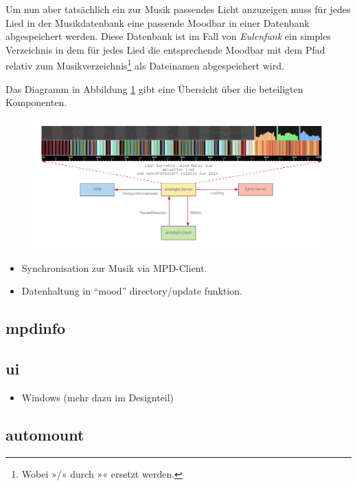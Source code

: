 \documentclass[11pt,ngerman,toc=listof,index=totoc]{scrreprt}
\providecommand{\tightlist}{%
  \setlength{\itemsep}{0pt}\setlength{\parskip}{0pt}}
\begin{document}
Um nun aber tatsächlich ein zur Musik passendes Licht anzuzeigen muss
für jedes Lied in der Musikdatenbank eine passende Moodbar in einer
Datenbank abgespeichert werden. Diese Datenbank ist im Fall von
\emph{Eulenfunk} ein simples Verzeichnis in dem für jedes Lied die
entsprechende Moodbar mit dem Pfad relativ zum
Musikverzeichnis\footnote{Wobei »/« durch »\textbar{}« ersetzt werden.}
als Dateinamen abgespeichert wird.

Das Diagramm in Abbildung \ref{eulenfunk-ambilight} gibt eine Übersicht
über die beteiligten Komponenten.

\begin{figure}[h!]
  \centering
  \includegraphics[width=1.0\textwidth]{images/eulenfunk-ambilight.png}
  \caption{}
  \label{eulenfunk-ambilight}
\end{figure}

\begin{itemize}
\tightlist
\item
  Synchronisation zur Musik via MPD-Client.
\item
  Datenhaltung in \enquote{mood} directory/update funktion.
\end{itemize}

\subsection{mpdinfo}\label{mpdinfo}

\subsection{ui}\label{ui}

\begin{itemize}
\tightlist
\item
  Windows (mehr dazu im Designteil)
\end{itemize}

\subsection{automount}\label{automount}
\end{document}
